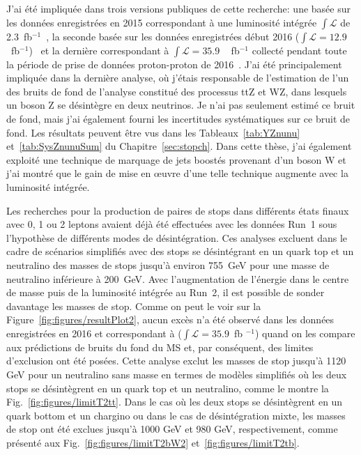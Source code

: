 J'ai été impliquée dans trois versions publiques de cette recherche: une basée sur les données enregistrées en 2015 correspondant à une luminosité intégrée $\int{\mathcal{L}} $ de 2.3~fb$^{-1}$~\cite{Sirunyan:2016jpr}, la seconde basée sur les données enregistrées début 2016 ($\int{\mathcal {L}} = 12.9 $~fb$^{-1} $)~\cite{CMS:2016vew} et la dernière correspondant à $ \int{\mathcal {L}} = 35.9 $ ~ fb$^{-1} $ collecté pendant toute la période de prise de données proton-proton de 2016~\cite{Sirunyan:2017xse}. J'ai été principalement impliquée dans la dernière analyse, où j'étais responsable de l'estimation de l'un des bruits de fond de l'analyse constitué des processus ttZ et WZ, dans lesquels un boson Z se désintègre en deux neutrinos. Je n’ai pas seulement estimé ce bruit de fond, mais j’ai également fourni les incertitudes systématiques sur ce bruit de fond. Les résultats peuvent être vus dans les Tableaux~\ref{tab:YZnunu} et~\ref{tab:SysZnunuSum} du Chapitre~\ref{sec:stopch}. Dans cette thèse, j'ai également exploité une technique de marquage de jets boostés provenant d'un boson W et j'ai montré que le gain de mise en œuvre d'une telle technique augmente avec la luminosité intégrée.


Les recherches pour la production de paires de stops dans différents états finaux avec 0, 1 ou 2 leptons avaient déjà été effectuées avec les données Run~1 sous l'hypothèse de différents modes de désintégration. Ces analyses excluent dans le cadre de scénarios simplifiés avec des stops se désintégrant en un quark top et un neutralino des masses de stops jusqu'à environ 755~GeV pour une masse de neutralino inférieure à 200~GeV. Avec l'augmentation de l'énergie dans le centre de masse puis de la luminosité intégrée au Run~2, il est possible de sonder davantage les masses de stop. Comme on peut le voir sur la Figure~\ref{fig:figures/resultPlot2}, aucun excès n'a été observé dans les données enregistrées en 2016 et correspondant à ($ \int{\mathcal {L}} = 35.9 $~fb $^{-1} $) quand on les compare aux prédictions de bruits du fond du MS et, par conséquent, des limites d'exclusion ont été posées. Cette analyse exclut les masses de stop jusqu’à 1120 GeV pour un neutralino sans masse en termes de modèles simplifiés où les deux stops se désintègrent en un quark top et un neutralino, comme le montre la Fig.~\ref{fig:figures/limitT2tt}. Dans le cas où les deux stops se désintègrent en un quark bottom et un chargino ou dans le cas de désintégration mixte, les masses de stop ont été exclues jusqu’à 1000 GeV et 980 GeV, respectivement, comme présenté aux Fig.~\ref{fig:figures/limitT2bW2}  et~\ref{fig:figures/limitT2tb}.

